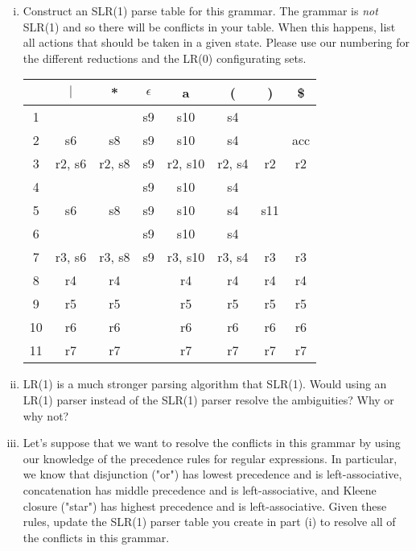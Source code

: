 \documentclass{article}
\begin{document}
\begin{enumerate}[i.]
	\item Construct an SLR(1) parse table for this grammar. The grammar is
		\emph{not} SLR(1) and so there will be conflicts in your table.
		When this happens, list all actions that should be taken in a
		given state. Please use our numbering for the different
		reductions and the LR(0) configurating sets.

		\begin{tabular}{|c|c|c|c|c|c|c|c|}
			                                                                     \hline
			   &  $|$   &  *     & $\epsilon$ &   a      &  (     &   ) &  \$ \\ \hline
			1  &        &        &     s9     & s10      & s4     &     &     \\ \hline
			2  & s6     & s8     &     s9     & s10      & s4     &     & acc \\ \hline
			3  & r2, s6 & r2, s8 &     s9     &  r2, s10 & r2, s4 &  r2 &  r2 \\ \hline
			4  &        &        &     s9     & s10      & s4     &     &     \\ \hline
			5  & s6     & s8     &     s9     & s10      & s4     & s11 &     \\ \hline
			6  &        &        &     s9     & s10      & s4     &     &     \\ \hline
			7  & r3, s6 & r3, s8 &     s9     &  r3, s10 & r3, s4 &  r3 &  r3 \\ \hline
			8  & r4     & r4     &            &  r4      & r4     &  r4 &  r4 \\ \hline
			9  & r5     & r5     &            &  r5      & r5     &  r5 &  r5 \\ \hline
			10 & r6     & r6     &            &  r6      & r6     &  r6 &  r6 \\ \hline
			11 & r7     & r7     &            &  r7      & r7     &  r7 &  r7 \\ \hline
		\end{tabular}

	\item LR(1) is a much stronger parsing algorithm that SLR(1). Would
		using an LR(1) parser instead of the SLR(1) parser resolve the
		ambiguities? Why or why not?


	\item Let's suppose that we want to resolve the conflicts in this
		grammar by using our knowledge of the precedence rules for
		regular expressions. In particular, we know that disjunction
		("or") has lowest precedence and is left-associative,
		concatenation has middle precedence and is left-associative,
		and Kleene closure ("star") has highest precedence and is
		left-associative. Given these rules, update the SLR(1) parser
		table you create in part (i) to resolve all of the conflicts
		in this grammar.


\end{enumerate}
\end{document}
